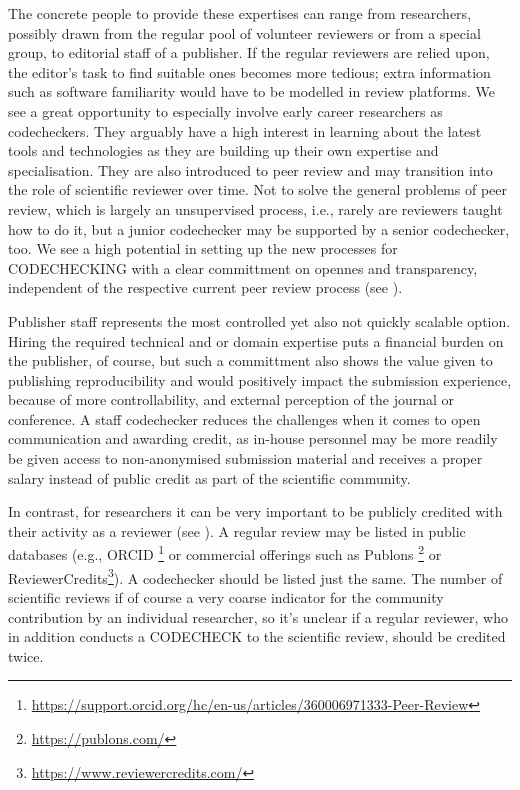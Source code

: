 \documentclass[12pt]{article}
\begin{document}
The concrete people to provide these expertises can range from researchers,
possibly drawn from the regular pool of volunteer reviewers or from a 
special group, to editorial staff of a publisher. If the regular reviewers
are relied upon, the editor's task to find suitable ones becomes more
tedious; extra information such as software familiarity would have to be
modelled in review platforms.
We see a great opportunity to especially involve early career 
researchers as codecheckers. They arguably have a high interest in learning
about the latest tools and technologies as they are building up their own
expertise and specialisation. They are also introduced to peer review and 
may transition into the role of scientific reviewer over time.
Not to solve the general problems of peer review, which is largely an
unsupervised process, i.e., rarely are reviewers taught how to do it, but
a junior codechecker may be supported by a senior codechecker, too.
We see a high potential in setting up the new processes for CODECHECKING with
a clear committment on opennes and transparency, independent of the
respective current peer review process (see ).

Publisher staff represents the most controlled yet also not quickly scalable
option. Hiring the required technical and or domain expertise puts a financial
burden on the publisher, of course, but such a committment also shows the 
value given to publishing reproducibility and would positively impact the 
submission experience, because of more controllability, and external 
perception of the journal or conference. A staff codechecker reduces the 
challenges when it comes to open communication and awarding credit, as
in-house personnel may be more readily be given access to non-anonymised
submission material and receives a proper salary instead of public credit
as part of the scientific community.

In contrast, for researchers it can be very important to be publicly credited
with their activity as a reviewer (see ). A regular
review may be listed in public databases (e.g., ORCID
\footnote{\href{https://support.orcid.org/hc/en-us/articles/360006971333-Peer-Review}{https://support.orcid.org/hc/en-us/articles/360006971333-Peer-Review}} or commercial offerings such as Publons
\footnote{\href{https://publons.com/}{https://publons.com/}} or 
ReviewerCredits\footnote{\href{https://www.reviewercredits.com/}{https://www.reviewercredits.com/}}).
A codechecker should be listed just the same. The number of scientific reviews
if of course a very coarse indicator for the community contribution by an 
individual researcher, so it's unclear if a regular reviewer, who in addition
conducts a CODECHECK to the scientific review, should be credited twice. 
\end{document}
